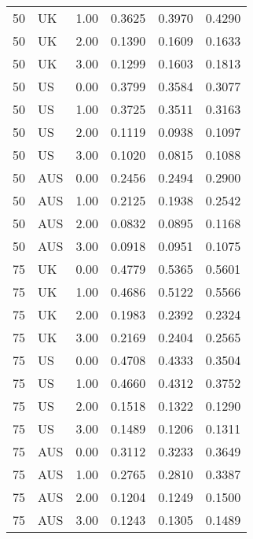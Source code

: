 \begin{table}[ht]
\begin{tabular}{llrlll}
  50 & UK & 1.00 & 0.3625 & 0.3970 & 0.4290 \\ 
  50 & UK & 2.00 & 0.1390 & 0.1609 & 0.1633 \\ 
  50 & UK & 3.00 & 0.1299 & 0.1603 & 0.1813 \\ 
  50 & US & 0.00 & 0.3799 & 0.3584 & 0.3077 \\ 
  50 & US & 1.00 & 0.3725 & 0.3511 & 0.3163 \\ 
  50 & US & 2.00 & 0.1119 & 0.0938 & 0.1097 \\ 
  50 & US & 3.00 & 0.1020 & 0.0815 & 0.1088 \\ 
  50 & AUS & 0.00 & 0.2456 & 0.2494 & 0.2900 \\ 
  50 & AUS & 1.00 & 0.2125 & 0.1938 & 0.2542 \\ 
  50 & AUS & 2.00 & 0.0832 & 0.0895 & 0.1168 \\ 
  50 & AUS & 3.00 & 0.0918 & 0.0951 & 0.1075 \\ 
  75 & UK & 0.00 & 0.4779 & 0.5365 & 0.5601 \\ 
  75 & UK & 1.00 & 0.4686 & 0.5122 & 0.5566 \\ 
  75 & UK & 2.00 & 0.1983 & 0.2392 & 0.2324 \\ 
  75 & UK & 3.00 & 0.2169 & 0.2404 & 0.2565 \\ 
  75 & US & 0.00 & 0.4708 & 0.4333 & 0.3504 \\ 
  75 & US & 1.00 & 0.4660 & 0.4312 & 0.3752 \\ 
  75 & US & 2.00 & 0.1518 & 0.1322 & 0.1290 \\ 
  75 & US & 3.00 & 0.1489 & 0.1206 & 0.1311 \\ 
  75 & AUS & 0.00 & 0.3112 & 0.3233 & 0.3649 \\ 
  75 & AUS & 1.00 & 0.2765 & 0.2810 & 0.3387 \\ 
  75 & AUS & 2.00 & 0.1204 & 0.1249 & 0.1500 \\ 
  75 & AUS & 3.00 & 0.1243 & 0.1305 & 0.1489 \\ 
   \hline
\end{tabular}
\end{table}
